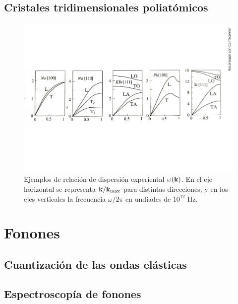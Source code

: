 \subsection{Cristales tridimensionales poliatómicos}

\begin{figure}[h!] \centering
    \includegraphics[scale=0.5]{Cuerpo/Ch_04/Fotos libro 7.pdf}
    \caption{Ejemplos de relación de dispersión experiental $\omega (\mathbf{k})$. En el eje horizontal se representa $\mathbf{k}/\mathbf{k}_{\max}$ para distintas direcciones, y en los ejes verticales la frecuencia $\omega/2\pi$ en undiades de $10^{12}$ Hz.}
    \label{Fig:04-07}
\end{figure}    



\section{Fonones}

\subsection{Cuantización de las ondas elásticas}

\subsection{Espectroscopía de fonones}


